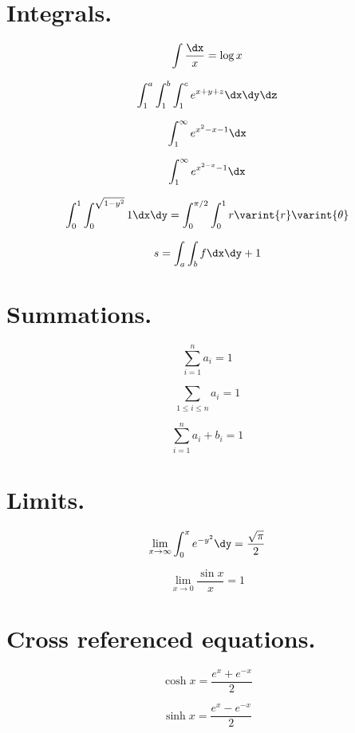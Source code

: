 
\section{Integrals. }


$$\int\frac{\dx}{x} =\log x$$

$$\int_1^a \int_1^b\int_1^c e^{x+y+z}\dx\dy\dz$$

$$\int_1^\infty e^{x^2-x-1}\dx$$

$$\int_1^\infty e^{x^{2-x}-1}\dx$$

$$\int_0^1\int_0^{\sqrt{1 -y^2}}1\dx\dy= \int_0^{\pi/2}\int_0^1
r\varint{r}\varint{\theta}$$

$$s=\int_a \int_b f \dx\dy+1$$



\section{Summations. }

$$\sum_{i=1}^n a_i =1$$

$$\sum_{1\leq i\leq n}a_i =1$$

$$\sum_{i=1}^n a_i + b_i = 1$$



\section{Limits. }

$$\lim_{x \to \infty}\int_0^x e^{-y^2}\dy = \frac{\sqrt{\pi}}{2}$$

$$\lim_{x\to 0}\frac{\sin x}{x} =1$$



\section{Cross referenced equations. }

\begin{equation}
\cosh x = \frac{e^x + e^{-x} }{2} \label{eq:cosh}
\end{equation}

\begin{equation}
\sinh x = \frac{e^x-e^{-x}}{2} \label{eq:sinh}
\end{equation}

